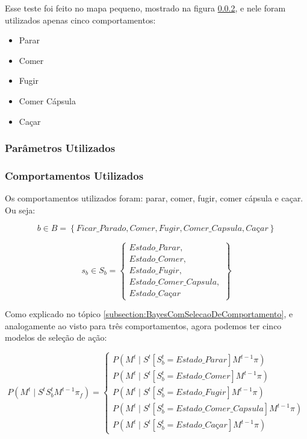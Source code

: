Esse teste foi feito no mapa pequeno, mostrado na figura \ref{}, e nele foram utilizados apenas cinco comportamentos:

\begin{itemize}
	\item Parar
	\item Comer
	\item Fugir
	\item Comer Cápsula
	\item Caçar
\end{itemize}

\subsubsection{Parâmetros Utilizados}

\subsubsection{Comportamentos Utilizados}


Os comportamentos utilizados foram: parar, comer, fugir, comer cápsula e caçar. Ou seja:

$$ b \in B = \left\{ Ficar\_Parado, Comer, Fugir, Comer\_Capsula, \textit{Caçar} \right\} $$

$$ s_b \in S_b = 
        \left\{
            \begin{array}{l}
                Estado\_Parar, \\
                Estado\_Comer, \\
                Estado\_Fugir, \\
                Estado\_Comer\_Capsula, \\
                \textit{Estado\_Caçar}
            \end{array}
        \right\}
         $$

Como explicado no tópico \ref{subsection:BayesComSelecaoDeComportamento}, e analogamente ao visto para três comportamentos, agora podemos ter cinco modelos de seleção de ação: 

\begin{equation}
    P \left( M^t \mid S^t S_b^t M^{t-1} \pi_f \right) = 
        \left\{
            \begin{array}{l}
                P \left( M^t \mid S^t \left[ S_b^t=Estado\_Parar \right] M^{t-1} \pi \right) \\
                P \left( M^t \mid S^t \left[ S_b^t=Estado\_Comer \right] M^{t-1} \pi \right) \\
                P \left( M^t \mid S^t \left[ S_b^t=Estado\_Fugir \right] M^{t-1} \pi \right) \\
                P \left( M^t \mid S^t \left[ S_b^t=Estado\_Comer\_Capsula \right] M^{t-1} \pi \right) \\
                P \left( M^t \mid S^t \left[ S_b^t=\textit{Estado\_Caçar} \right] M^{t-1} \pi \right)
            \end{array}
        \right.
\end{equation}

